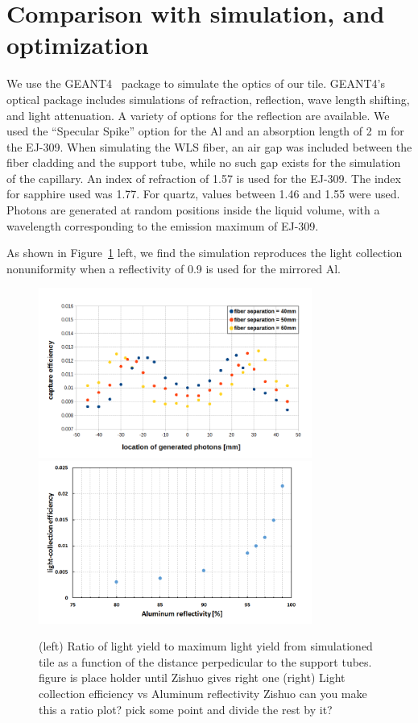 \documentclass[review]{elsarticle}
\begin{document}
\section{Comparison with simulation, and optimization}
We use the GEANT4~\cite{Agostinelli2003250} package to simulate the
optics of our tile. GEANT4's optical package includes simulations of
refraction, reflection, wave length shifting, and light attenuation.
A variety of options for the reflection are available. We used the
``Specular Spike'' option for the Al and an absorption length of 2~m for
the EJ-309. When simulating the WLS fiber, an air gap was included
between the fiber cladding and the support tube, while no such gap
exists for the simulation of the capillary. An index of refraction of
1.57 is used for the EJ-309. The index for sapphire used was 1.77.
For quartz, values between 1.46 and 1.55 were used. Photons are
generated at random positions inside the liquid volume, with a
wavelength corresponding to the emission maximum of EJ-309.

As shown in Figure~\ref{fig:simeff} left, we find the simulation
reproduces the light collection nonuniformity when a reflectivity of
0.9 is used for the mirrored Al.

\begin{figure}[!ht]
\begin{center}
\includegraphics[width=0.8\textwidth]{./figures/geant_result_uniformity.png}
\includegraphics[width=0.8\textwidth]{./figures/geant_result_reflectivity.png}
\caption{(left) Ratio of light yield to maximum light yield from
  simulationed tile as a function of the distance perpedicular to the
  support tubes. {\color{red} figure is place holder until Zishuo
    gives right one} (right) Light collection efficiency vs Aluminum
  reflectivity {\color{red} Zishuo can you make this a ratio plot?
    pick some point and divide the rest by it?} }
\label{fig:simeff}
\end{center}
\end{figure}
\end{document}
